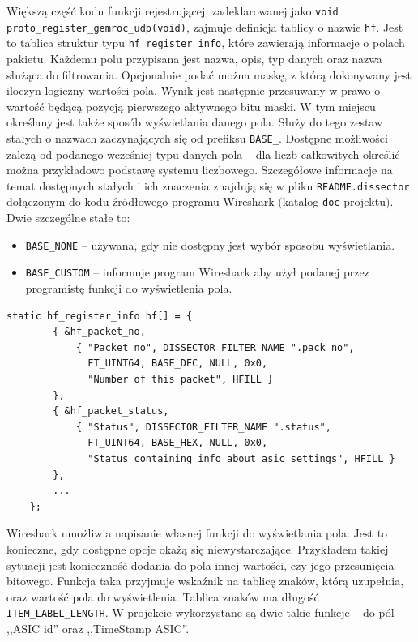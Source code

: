 \documentclass[a4paper, 12pt, twoside, openright]{article}
\begin{document}
	\indent\par
	Większą część kodu funkcji rejestrującej, zadeklarowanej jako \texttt{void proto\_register\_gemroc\_udp(void)}, zajmuje definicja tablicy
	o nazwie \texttt{hf}. Jest to tablica struktur typu \texttt{hf\_register\_info}, które zawierają informacje o polach pakietu. Każdemu polu przypisana
	jest nazwa, opis, typ danych oraz nazwa służąca do filtrowania. Opcjonalnie podać można maskę, z którą dokonywany jest iloczyn logiczny
	wartości pola. Wynik jest następnie przesuwany w prawo o wartość będącą pozycją pierwszego aktywnego bitu maski.
	W tym miejscu określany jest także sposób wyświetlania danego pola. Służy do tego zestaw stałych o nazwach
	zaczynających się od prefiksu \texttt{BASE\_}. Dostępne możliwości zależą od podanego wcześniej typu danych pola -- dla liczb całkowitych
	określić można przykładowo podstawę systemu liczbowego. Szczegółowe informacje na temat dostępnych stałych i ich znaczenia
	znajdują się w pliku \texttt{README.dissector} dołączonym do kodu źródłowego programu Wireshark $($katalog \texttt{doc} projektu$)$.
	Dwie szczególne stałe to:
	\begin{itemize}
		\item \texttt{BASE\_NONE} -- używana, gdy nie dostępny jest wybór sposobu wyświetlania.
		\item \texttt{BASE\_CUSTOM} -- informuje program Wireshark aby użył podanej przez programistę funkcji do wyświetlenia pola.
	\end{itemize}

	\begin{lstlisting}[style=CStyle]
	static hf_register_info hf[] = {
		{ &hf_packet_no,
			{ "Packet no", DISSECTOR_FILTER_NAME ".pack_no",
			  FT_UINT64, BASE_DEC, NULL, 0x0,
			  "Number of this packet", HFILL }
		},
		{ &hf_packet_status,
			{ "Status", DISSECTOR_FILTER_NAME ".status",
			  FT_UINT64, BASE_HEX, NULL, 0x0,
			  "Status containing info about asic settings", HFILL }
		},
		...
	};

	\end{lstlisting}

	Wireshark umożliwia napisanie własnej funkcji do wyświetlania pola. Jest to konieczne, gdy dostępne opcje okażą się niewystarczające.
	Przykładem takiej sytuacji jest konieczność dodania do pola innej wartości, czy jego przesunięcia bitowego.
	Funkcja taka przyjmuje wskaźnik na tablicę znaków, którą uzupełnia, oraz wartość pola do wyświetlenia. Tablica znaków ma długość
	\texttt{ITEM\_LABEL\_LENGTH}. W projekcie wykorzystane są dwie takie funkcje -- do pól ,,ASIC id'' oraz ,,TimeStamp ASIC''.
\end{document}

